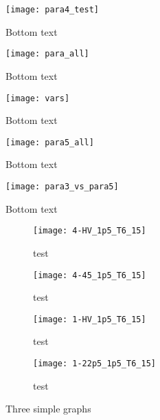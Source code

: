 \begin{figure}
    \centering
    \texttt{[image: para4\_test]}
    \caption{Bottom text}
    \label{fig:para4_test}
\end{figure}

\begin{figure}
    \centering
    \texttt{[image: para\_all]}
    \caption{Bottom text}
    \label{fig:para_all}
\end{figure}

\begin{figure}
    \centering
    \texttt{[image: vars]}
    \caption{Bottom text}
    \label{fig:para_vars}
\end{figure}

\begin{figure}
    \centering
    \texttt{[image: para5\_all]}
    \caption{Bottom text}
    \label{fig:para5_all}
\end{figure}

\begin{figure}
    \centering
    \texttt{[image: para3\_vs\_para5]}
    \caption{Bottom text}
    \label{fig:para3_vs_para5}
\end{figure}

\begin{figure}
    \centering
    \begin{subfigure}[b]{0.45\textwidth}
        \centering
        \texttt{[image: 4-HV\_1p5\_T6\_15]}
        \caption{test}
        \label{fig:y equals x}
    \end{subfigure}
    \begin{subfigure}[b]{0.45\textwidth}
        \centering
        \texttt{[image: 4-45\_1p5\_T6\_15]}
        \caption{test}
        \label{fig:three sin x}
    \end{subfigure}
    \begin{subfigure}[b]{0.45\textwidth}
        \centering
        \texttt{[image: 1-HV\_1p5\_T6\_15]}
        \caption{test}
        \label{fig:five over x}
    \end{subfigure}
    \begin{subfigure}[b]{0.45\textwidth}
        \centering
        \texttt{[image: 1-22p5\_1p5\_T6\_15]}
        \caption{test}
        \label{fig:blah}
    \end{subfigure}
       \caption{Three simple graphs}
       \label{fig:three graphs}
\end{figure}